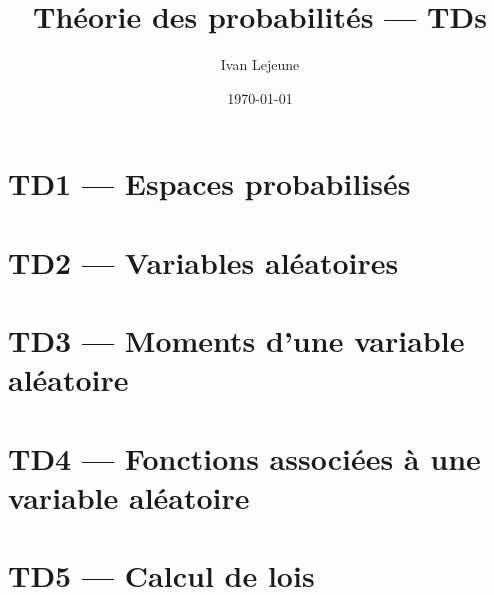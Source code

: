 \documentclass[french,a4paper,10pt]{article}
\title{\color{astral} \sffamily \bfseries Théorie des probabilités --- TDs}
\author{Ivan Lejeune}
\date{\today}
\begin{document}
    \maketitle
    \tableofcontents
    
    \newpage
    \section*{TD1 --- Espaces probabilisés}\label{sec:TD1}
    \setcounter{section}{1}
    \setcounter{tdcounter}{0}
    

    \newpage
    \section*{TD2 --- Variables aléatoires}\label{sec:TD2}
    \setcounter{section}{2}
    \setcounter{tdcounter}{0}
    
    
    \newpage
    \section*{TD3 --- Moments d'une variable aléatoire}\label{sec:TD3}
    \setcounter{section}{3}
    \setcounter{tdcounter}{0}
    

    \newpage
    \section*{TD4 --- Fonctions associées à une variable aléatoire}\label{sec:TD4}
    \setcounter{section}{4}
    \setcounter{tdcounter}{0}
    

    \newpage
    \section*{TD5 --- Calcul de lois}\label{sec:TD5}
    \setcounter{section}{5}
    \setcounter{tdcounter}{0}
    
\end{document}
